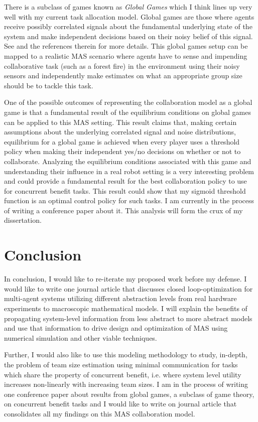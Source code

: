 \documentclass[11pt, onecolumn, compsoc, letterpaper]{article}
\begin{document}
There is a subclass of games known as \emph{Global Games} \cite{Carlsson1993, Morris2001} which I think lines up very well with my current task allocation model. Global games are those where agents receive possibly correlated signals about the fundamental underlying state of the system and make independent decisions based on their noisy belief of this signal. See \cite{Morris2001} and the references therein for more details. This global games setup can be mapped to a realistic MAS scenario where agents have to sense and impending collaborative task (such as a forest fire) in the environment using their noisy sensors and independently make estimates on what an appropriate group size should be to tackle this task. 

One of the possible outcomes of representing the collaboration model as a global game is that a fundamental result of the equilibrium conditions on global games can be applied to this MAS setting. This result claims that, making certain assumptions about the underlying correlated signal and noise distributions, equilibrium for a global game is achieved when every player uses a threshold policy when making their independent yes/no decisions on whether or not to collaborate. Analyzing the equilibrium conditions associated with this game and understanding their influence in a real robot setting is a very interesting problem and could provide a fundamental result for the best collaboration policy to use for concurrent benefit tasks. This result could show that my sigmoid threshold function is an optimal control policy for such tasks. I am currently in the process of writing a conference paper about it. This analysis will form the crux of my dissertation.

\section{Conclusion}
In conclusion, I would like to re-iterate my proposed work before my defense. I would like to write one journal article that discusses closed loop-optimization for multi-agent systems utilizing different abstraction levels from real hardware experiments to macroscopic mathematical models. I will explain the benefits of propagating system-level information from less abstract to more abstract models and use that information to drive design and optimization of MAS using numerical simulation and other viable techniques. 

Further, I would also like to use this modeling methodology to study, in-depth, the problem of team size estimation using minimal communication for tasks which share the property of concurrent benefit, i.e. where system level utility increases non-linearly with increasing team sizes. I am in the process of writing one conference paper about results from global games, a subclass of game theory, on concurrent benefit tasks and I would like to write on journal article that consolidates all my findings on this MAS collaboration model. 
\end{document}
